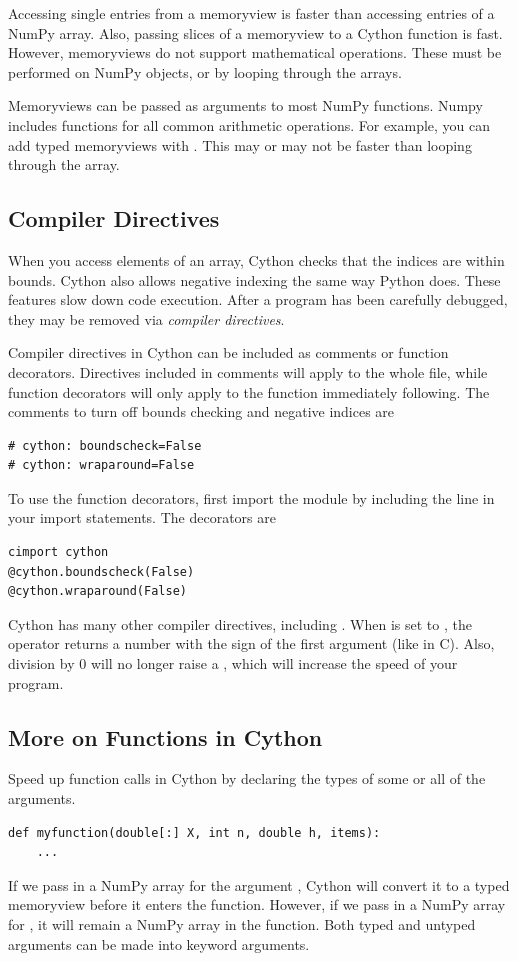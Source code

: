 Accessing single entries from a memoryview is faster than accessing entries of a NumPy array.
Also, passing slices of a memoryview to a Cython function is fast.
However, memoryviews do not support mathematical operations.
These must be performed on NumPy objects, or by looping through the arrays.

\begin{info}
Memoryviews can be passed as arguments to most NumPy functions.
Numpy includes functions for all common arithmetic operations.
For example, you can add typed memoryviews with .
This may or may not be faster than looping through the array.
\end{info}

\subsection*{Compiler Directives}
When you access elements of an array, Cython checks that the indices are within bounds.
Cython also allows negative indexing the same way Python does.
These features slow down code execution.
After a program has been carefully debugged, they may be removed via \emph{compiler directives}.

Compiler directives in Cython can be included as comments or function decorators.
Directives included in comments will apply to the whole file, while function decorators will only apply to the function immediately following.
The comments to turn off bounds checking and negative indices are
\begin{lstlisting}
# cython: boundscheck=False
# cython: wraparound=False
\end{lstlisting}
To use the function decorators, first import the  module by including the line  in your import statements.
The decorators are
\begin{lstlisting}
cimport cython
@cython.boundscheck(False)
@cython.wraparound(False)
\end{lstlisting}

Cython has many other compiler directives, including .
When  is set to , the \li{\%} operator returns a number with the sign of the first argument (like in C).
Also, division by 0 will no longer raise a , which will increase the speed of your program.

\subsection*{More on Functions in Cython}
Speed up function calls in Cython by declaring the types of some or all of the arguments.
\begin{lstlisting}
def myfunction(double[:] X, int n, double h, items):
    ...
\end{lstlisting}
If we pass in a NumPy array for the argument , Cython will convert it to a typed memoryview before it enters the function.
However, if we pass in a NumPy array for , it will remain a NumPy array in the function.
Both typed and untyped arguments can be made into keyword arguments.

